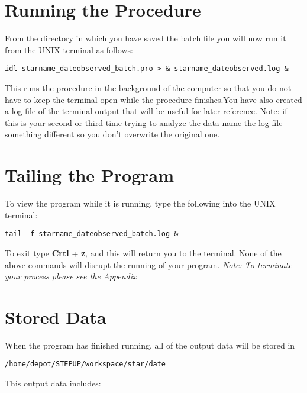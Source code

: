 \documentclass[10pt,preprint]{aastex}
\begin{document}
\section{Running the Procedure}
From the directory in which you have saved the batch file you will now run it from the UNIX terminal 
as follows:

\begin{verbatim}
idl starname_dateobserved_batch.pro > & starname_dateobserved.log &
\end{verbatim}

This runs the procedure in the background of the computer so that you do not have to keep the terminal 
open while the procedure finishes.You have also created a log file of the terminal output that will be 
useful for later reference. Note: if this is your second or third time trying to analyze the data name the 
log file something different so you don't overwrite the original one.

\section{Tailing the Program}
To view the program while it is running, type the following into the UNIX terminal:

\begin{verbatim}
tail -f starname_dateobserved_batch.log &
\end{verbatim}

To exit type \textbf{Crtl} + \textbf{z}, and this will return you to the terminal. 
None of the above commands will disrupt the running of your program. 
\emph{Note: To terminate your process please see the Appendix}

\section{\textbf{Stored Data}}
When the program has finished running, all of the output data will be stored in

\begin{verbatim}/home/depot/STEPUP/workspace/star/date\end{verbatim}

This output data includes:\\
\end{document}
